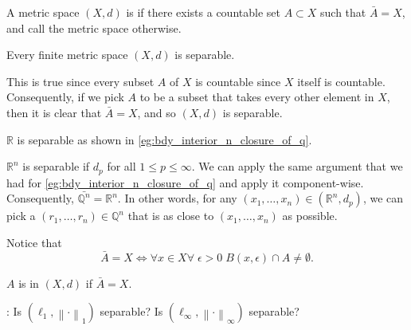 \documentclass[notoc,notitlepage]{tufte-book}
\newcommand{\norm}[1]{\left\| #1 \right\|}
\begin{document}
\begin{defn}[Separable]\label{defn:separable}
  A metric space $(X, d)$ is  if there exists a countable set $A \subset X$ such that $\bar{A} = X$, and call the metric space  otherwise.
\end{defn}

\begin{eg}
  Every finite metric space $(X, d)$ is separable.

  This is true since every subset $A$ of $X$ is countable since $X$ itself is countable. Consequently, if we pick $A$ to be a subset that takes every other element in $X$, then it is clear that $\bar{A} = X$, and so $(X, d)$ is separable.
\end{eg}

\begin{eg}
  $\mathbb{R}$ is separable as shown in \cref{eg:bdy_interior_n_closure_of_q}.
\end{eg}

\begin{eg}
  $\mathbb{R}^n$ is separable if $d_p$ for all $1 \leq p \leq \infty$. We can apply the same argument that we had for \cref{eg:bdy_interior_n_closure_of_q} and apply it component-wise. Consequently, $\bar{\mathbb{Q}^n} = \mathbb{R}^n$. In other words, for any $(x_1, \ldots, x_n) \in (\mathbb{R}^n, d_p)$, we can pick a $(r_1, \ldots, r_n) \in \mathbb{Q}^n$ that is as close to $(x_1, \ldots, x_n)$ as possible.
\end{eg}

\begin{remark}
  Notice that
  \begin{equation*}
    \bar{A} = X \iff \forall x \in X \forall \; \epsilon > 0 \; B(x, \epsilon) \cap A \neq \emptyset.
  \end{equation*}
\end{remark}

\begin{defn}[Dense]\label{defn:dense}
  $A$ is  in $(X, d)$ if $\bar{A} = X$.
\end{defn}

: Is $(\ell_1, \norm\cdot_1)$ separable? Is $(\ell_\infty, \norm\cdot_\infty)$ separable?
\end{document}
